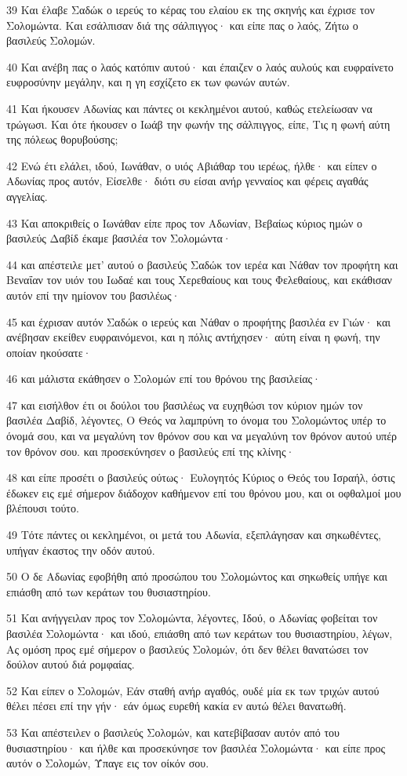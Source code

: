\par 39 Και έλαβε Σαδώκ ο ιερεύς το κέρας του ελαίου εκ της σκηνής και έχρισε τον Σολομώντα. Και εσάλπισαν διά της σάλπιγγος· και είπε πας ο λαός, Ζήτω ο βασιλεύς Σολομών.
\par 40 Και ανέβη πας ο λαός κατόπιν αυτού· και έπαιζεν ο λαός αυλούς και ευφραίνετο ευφροσύνην μεγάλην, και η γη εσχίζετο εκ των φωνών αυτών.
\par 41 Και ήκουσεν Αδωνίας και πάντες οι κεκλημένοι αυτού, καθώς ετελείωσαν να τρώγωσι. Και ότε ήκουσεν ο Ιωάβ την φωνήν της σάλπιγγος, είπε, Τις η φωνή αύτη της πόλεως θορυβούσης;
\par 42 Ενώ έτι ελάλει, ιδού, Ιωνάθαν, ο υιός Αβιάθαρ του ιερέως, ήλθε· και είπεν ο Αδωνίας προς αυτόν, Είσελθε· διότι συ είσαι ανήρ γενναίος και φέρεις αγαθάς αγγελίας.
\par 43 Και αποκριθείς ο Ιωνάθαν είπε προς τον Αδωνίαν, Βεβαίως κύριος ημών ο βασιλεύς Δαβίδ έκαμε βασιλέα τον Σολομώντα·
\par 44 και απέστειλε μετ' αυτού ο βασιλεύς Σαδώκ τον ιερέα και Νάθαν τον προφήτη και Βεναΐαν τον υιόν του Ιωδαέ και τους Χερεθαίους και τους Φελεθαίους, και εκάθισαν αυτόν επί την ημίονον του βασιλέως·
\par 45 και έχρισαν αυτόν Σαδώκ ο ιερεύς και Νάθαν ο προφήτης βασιλέα εν Γιών· και ανέβησαν εκείθεν ευφραινόμενοι, και η πόλις αντήχησεν· αύτη είναι η φωνή, την οποίαν ηκούσατε·
\par 46 και μάλιστα εκάθησεν ο Σολομών επί του θρόνου της βασιλείας·
\par 47 και εισήλθον έτι οι δούλοι του βασιλέως να ευχηθώσι τον κύριον ημών τον βασιλέα Δαβίδ, λέγοντες, Ο Θεός να λαμπρύνη το όνομα του Σολομώντος υπέρ το όνομά σου, και να μεγαλύνη τον θρόνον σου και να μεγαλύνη τον θρόνον αυτού υπέρ τον θρόνον σου. και προσεκύνησεν ο βασιλεύς επί της κλίνης·
\par 48 και είπε προσέτι ο βασιλεύς ούτως· Ευλογητός Κύριος ο Θεός του Ισραήλ, όστις έδωκεν εις εμέ σήμερον διάδοχον καθήμενον επί του θρόνου μου, και οι οφθαλμοί μου βλέπουσι τούτο.
\par 49 Τότε πάντες οι κεκλημένοι, οι μετά του Αδωνία, εξεπλάγησαν και σηκωθέντες, υπήγαν έκαστος την οδόν αυτού.
\par 50 Ο δε Αδωνίας εφοβήθη από προσώπου του Σολομώντος και σηκωθείς υπήγε και επιάσθη από των κεράτων του θυσιαστηρίου.
\par 51 Και ανήγγειλαν προς τον Σολομώντα, λέγοντες, Ιδού, ο Αδωνίας φοβείται τον βασιλέα Σολομώντα· και ιδού, επιάσθη από των κεράτων του θυσιαστηρίου, λέγων, Ας ομόση προς εμέ σήμερον ο βασιλεύς Σολομών, ότι δεν θέλει θανατώσει τον δούλον αυτού διά ρομφαίας.
\par 52 Και είπεν ο Σολομών, Εάν σταθή ανήρ αγαθός, ουδέ μία εκ των τριχών αυτού θέλει πέσει επί την γήν· εάν όμως ευρεθή κακία εν αυτώ θέλει θανατωθή.
\par 53 Και απέστειλεν ο βασιλεύς Σολομών, και κατεβίβασαν αυτόν από του θυσιαστηρίου· και ήλθε και προσεκύνησε τον βασιλέα Σολομώντα· και είπε προς αυτόν ο Σολομών, Ύπαγε εις τον οίκόν σου.

